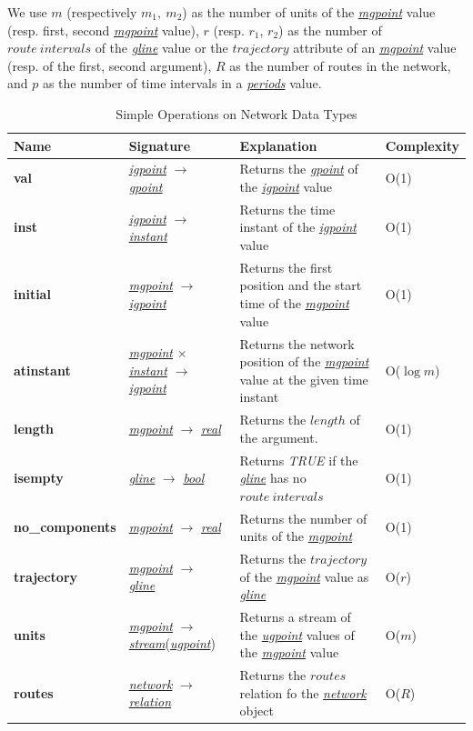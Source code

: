 \documentclass[a4paper]{article}
\newcommand{\op}[1]{\textbf{#1}}
\newcommand{\dt}[1]{\textsl{\underline{#1}}}
\newcommand{\true}{\textsl{TRUE}}
\begin{document}
We use $m$ (respectively $m_1,\ m_2$) as the number of units of the
\dt{mgpoint} value (resp. first, second \dt{mgpoint} value),
$r$ (resp. $r_1$, $r_2$) as the number of $route\ intervals$ of the \dt{gline}
value or the $trajectory$ attribute of an \dt{mgpoint} value (resp. of the
first, second argument), $R$ as the number of routes in the network, and $p$ as
the number of time intervals in a \dt{periods} value.
\begin{table}
  \caption{Simple Operations on Network Data Types}
  \label{tab:simplenetoperations}
  \begin{center}
  \begin{tabularx}{1.0\textwidth}{|l|l|X|l|}
  \hline
  \textbf{Name}& \textbf{Signature}& \textbf{Explanation}& \textbf{Complexity}\\
  \hline
\op{val}&\dt{igpoint} $\rightarrow$ \dt{gpoint}& Returns the \dt{gpoint} of the
\dt{igpoint} value&O(1)\\
  \hline
\op{inst}&\dt{igpoint} $\rightarrow$ \dt{instant}& Returns the time instant of the
\dt{igpoint} value &O(1)\\
  \hline
  \op{initial}&\dt{mgpoint} $\rightarrow$ \dt{igpoint}& Returns the first position
and the start time of the \dt{mgpoint} value& O(1)\\
  \hline
  \op{atinstant}&\dt{mgpoint} $\times$ \dt{instant} $\rightarrow$ \dt{igpoint}&
Returns the network position of the \dt{mgpoint} value at the given time instant& O($\log m$)\\
  \hline
  \op{length}&\dt{mgpoint} $\rightarrow$ \dt{real}& Returns the $length$ of the argument.&O(1)\\
  \hline
\op{isempty}&\dt{gline} $\rightarrow$ \dt{bool}& Returns \true{} if the \dt{gline}
has no $route\ intervals$ & O(1)\\
  \hline
\op{no\_components}&\dt{mgpoint} $\rightarrow$ \dt{real}& Returns the number of
units of the \dt{mgpoint} &O(1)\\
  \hline
\op{trajectory}&\dt{mgpoint} $\rightarrow$ \dt{gline}& Returns the $trajectory$
of the \dt{mgpoint} value as \dt{gline}&O($r$)\\
  \hline
  \op{units}&\dt{mgpoint} $\rightarrow$ \dt{stream}(\dt{ugpoint})& Returns a stream
of the \dt{ugpoint} values of the \dt{mgpoint} value& O($m$)\\
  \hline
  \op{routes}& \dt{network} $\rightarrow$ \dt{relation} & Returns the $routes$
relation fo the \dt{network} object & O($R$)\\

\end{tabularx}
\end{center}
\end{table}
\end{document}
